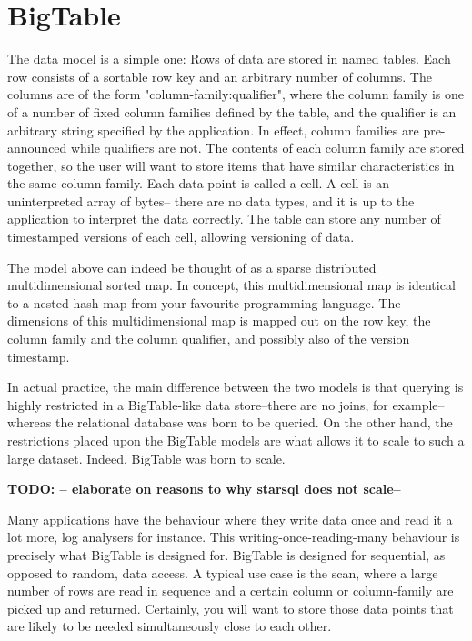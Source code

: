 \documentclass[a4paper,10pt]{book}
\begin{document}
\section{BigTable}

The data model is a simple one: Rows of data are stored in named tables.
Each row consists of a sortable row key and an arbitrary number of columns.
The columns are of the form "column-family:qualifier", where the column
family is one of a number of fixed column families defined by the table,
and the qualifier is an arbitrary string specified by the application. In
effect, column families are pre-announced while qualifiers are not. The
contents of each column family are stored together, so the user will want
to store items that have similar characteristics in the same column family.
Each data point is called a cell. A cell is an uninterpreted array of
bytes-- there are no data types, and it is up to the application to
interpret the data correctly. The table can store any number of timestamped
versions of each cell, allowing versioning of data.

The model above can indeed be thought of as a sparse distributed
multidimensional sorted map. In concept, this multidimensional map is
identical to a nested hash map from your favourite programming language. The
dimensions of this multidimensional map is mapped out on the row key, the
column family and the column qualifier, and possibly also of the version
timestamp.

In actual practice, the main difference between the two models is that
querying is highly restricted in a BigTable-like data store--there are no
joins, for example--whereas the relational database was born to be queried.
On the other hand, the restrictions placed upon the BigTable models are
what allows it to scale to such a large dataset. Indeed, BigTable was born
to scale.

\textbf{TODO: -- elaborate on reasons to why starsql does not scale--}

Many applications have the behaviour where they write data once and read it
a lot more, log analysers for instance. This writing-once-reading-many
behaviour is precisely what BigTable is designed for. BigTable is designed
for sequential, as opposed to random, data access. A typical use case is
the scan, where a large number of rows are read in sequence and a certain
column or column-family are picked up and returned. Certainly, you will
want to store those data points that are likely to be needed simultaneously
close to each other. \cite{bigtable}
\end{document}
